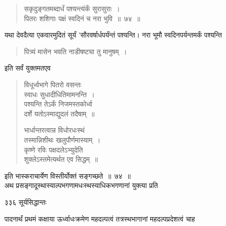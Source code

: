 \documentclass[11pt, openany]{book}
\begin{document}

\begin{quote}
{\ssi सकृदुङ्गतमब्दार्धं पश्यन्त्यंर्कं सुरासुराः~।\\
पितरः शशिगाः पक्षं स्वदिनं च नरा भुवि~॥~७४~॥}
\end{quote}
 यथा देवदैत्या एकवारमुदितं सूर्यं 'सौरवर्षार्धपर्यंन्तं पश्यन्ति। नरा भूमौ स्वदिनपर्यन्तमर्कं पश्यन्ति 


 \begin{quote}
{\qt  पित्र्यं मासेन भवति नाडीषष्ट्या तु मानुषम्~। }
\end{quote}
इति सर्वं युक्तमतएव \textendash


 \begin{quote}
{\qt विधूर्ध्वभागे पितरो वसन्तः \\
स्वाधः सुधादीधितिमामनन्ति~।\\
पश्यन्ति तेऽर्कं निजमस्तकोर्ध्व \\
दर्शे यतोऽस्माद्युदलं तदैषाम्~॥

भार्धान्तरत्वान्न विधोरधःस्थं \\
तस्मान्निशीथः खलुपौर्णमास्याम्~।\\
कृष्णे रविः पक्षदलेऽभ्युदेति \\
शुक्लेऽस्तमेत्यर्थत एव सिद्धम्~॥}
\end{quote}
इति भास्कराचार्येण विस्तीर्योक्तं सङ्गच्छते~॥~७४~॥ \\
\noindent अथ प्रसङ्गादूस्थास्याल्पभगणामधःस्थस्याधिकभगणानां युक्त्या प्रति \textendash



\newpage


\noindent ३३६ \hspace{4cm} सूर्यसिद्धान्तः
\vspace{1cm}


पादनार्थं प्रथमं कक्षाया ऊर्ध्वाधःक्रमेण महदल्पत्वं तत्रस्थभागानां महदल्पप्रदेशत्वं चाह \textendash

\end{document}
